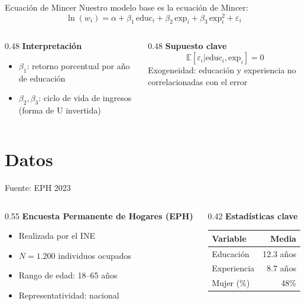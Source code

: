 \documentclass[aspectratio=169]{beamer}
\begin{document}
\begin{frame}{Ecuación de Mincer}
  Nuestro modelo base es la ecuación de Mincer:
  \[
    \ln(w_i) = \alpha + \beta_1 \, \text{educ}_i + \beta_2 \, \text{exp}_i 
               + \beta_3 \, \text{exp}_i^2 + \varepsilon_i
  \]

  \begin{columns}[T]
    \begin{column}{0.48\textwidth}
      \textbf{Interpretación}
      \begin{itemize}
        \item $\beta_1$: retorno porcentual por año de educación
        \item $\beta_2, \beta_3$: ciclo de vida de ingresos (forma de U invertida)
      \end{itemize}
    \end{column}
    \begin{column}{0.48\textwidth}
      \textbf{Supuesto clave}
      \[
        \mathbb{E}[\varepsilon_i | \text{educ}_i, \text{exp}_i] = 0
      \]
      Exogeneidad: educación y experiencia no correlacionadas con el error
    \end{column}
  \end{columns}
\end{frame}

\section{Datos}

\begin{frame}{Fuente: EPH 2023}
  \begin{columns}[T]
    \begin{column}{0.55\textwidth}
      \textbf{Encuesta Permanente de Hogares (EPH)}
      \begin{itemize}
        \item Realizada por el INE
        \item $N = 1.200$ individuos ocupados
        \item Rango de edad: 18--65 años
        \item Representatividad: nacional
      \end{itemize}
    \end{column}
    \begin{column}{0.42\textwidth}
      \textbf{Estadísticas clave}
      \begin{center}
      \begin{tabular}{lr}
        \toprule
        Variable      & Media \\
        \midrule
        Educación     & 12.3 años \\
        Experiencia   & 8.7 años  \\
        Mujer (\%)    & 48\%      \\
        \bottomrule
      \end{tabular}
      \end{center}
    \end{column}
  \end{columns}
\end{frame}
\end{document}
